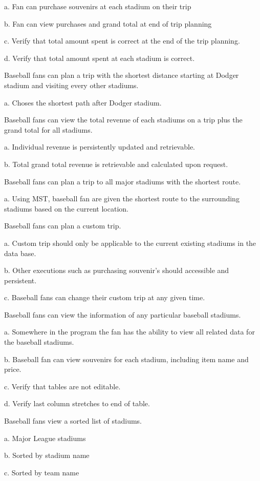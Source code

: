 \begin{DoxyEnumerate}
a. Fan can purchase souvenirs at each stadium on their trip

b. Fan can view purchases and grand total at end of trip planning

c. Verify that total amount spent is correct at the end of the trip planning.

d. Verify that total amount spent at each stadium is correct.
\item Baseball fans can plan a trip with the shortest distance starting at Dodger stadium and visiting every other stadiums.

a. Choses the shortest path after Dodger stadium.
\item Baseball fans can view the total revenue of each stadiums on a trip plus the grand total for all stadiums.

a. Individual revenue is persistently updated and retrievable.

b. Total grand total revenue is retrievable and calculated upon request.
\item Baseball fans can plan a trip to all major stadiums with the shortest route.

a. Using M\+ST, baseball fan are given the shortest route to the surrounding stadiums based on the current location.
\item Baseball fans can plan a custom trip.

a. Custom trip should only be applicable to the current existing stadiums in the data base.

b. Other executions such as purchasing souvenir’s should accessible and persistent.

c. Baseball fans can change their custom trip at any given time.
\item Baseball fans can view the information of any particular baseball stadiums.

a. Somewhere in the program the fan has the ability to view all related data for the baseball stadiums.

b. Baseball fan can view souvenirs for each stadium, including item name and price.

c. Verify that tables are not editable.

d. Verify last column stretches to end of table.
\item Baseball fans view a sorted list of stadiums.

a. Major League stadiums

b. Sorted by stadium name

c. Sorted by team name


\end{DoxyEnumerate}
